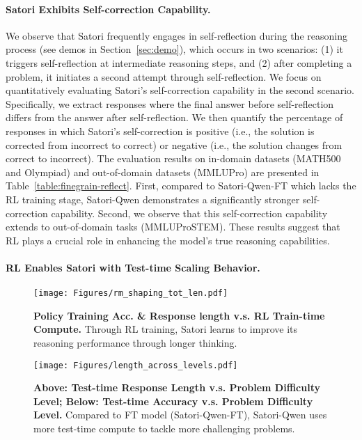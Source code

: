 \paragraph{Satori Exhibits Self-correction Capability.}

We observe that Satori frequently engages in self-reflection during the reasoning process (see demos in Section~\ref{sec:demo}), which occurs in two scenarios: (1) it triggers self-reflection at intermediate reasoning steps, and (2) after completing a problem, it initiates a second attempt through self-reflection. We focus on quantitatively evaluating Satori's self-correction capability in the second scenario. Specifically, we extract responses where the final answer before self-reflection differs from the answer after self-reflection. We then quantify the percentage of responses in which Satori's self-correction is positive (i.e., the solution is corrected from incorrect to correct) or negative (i.e., the solution changes from correct to incorrect). The evaluation results on in-domain datasets (MATH500 and Olympiad) and out-of-domain datasets (MMLUPro) are presented in Table~\ref{table:finegrain-reflect}. First, compared to Satori-Qwen-FT which lacks the RL training stage, Satori-Qwen demonstrates a significantly stronger self-correction capability. Second, we observe that this self-correction capability extends to out-of-domain tasks (MMLUProSTEM). These results suggest that RL plays a crucial role in enhancing the model's true reasoning capabilities.


\paragraph{RL Enables Satori with Test-time Scaling Behavior.}
\begin{figure}[h]
    \centering
    \texttt{[image: Figures/rm\_shaping\_tot\_len.pdf]}
    \vspace{-2em}
\caption{\textbf{Policy Training Acc. \& Response length v.s. RL Train-time Compute.} Through RL training, Satori learns to improve its reasoning performance through longer thinking.}
\label{fig:test_time_scaling}
\end{figure}
\begin{figure}[h]
    \centering
    \texttt{[image: Figures/length\_across\_levels.pdf]}
    \vspace{-1.5em}
\caption{\textbf{Above: Test-time Response Length v.s. Problem Difficulty Level; Below: Test-time Accuracy v.s. Problem Difficulty Level.} Compared to FT model (Satori-Qwen-FT), Satori-Qwen uses more test-time compute to tackle more challenging problems.}
\label{fig:difficulty_level}
\vspace{-1em}
\end{figure}

